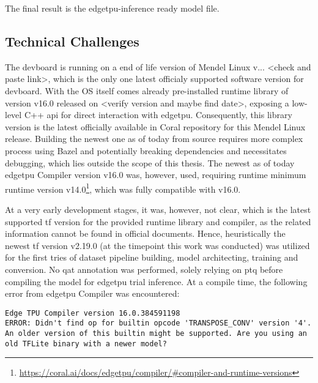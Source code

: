 {The final result is the \gls{edgetpu}-inference ready  model file.

\subsection*{Technical Challenges}

The \gls{devboard} is running on a end of life version of Mendel Linux v...  <check and paste link>, which is the only one latest officialy supported software version for \gls{devboard}.
With the OS itself comes already pre-installed runtime library  of version v16.0 released on <verify version and maybe find date>, exposing a low-level C++ \gls{api}
for direct interaction with \gls{edgetpu}. Consequently, this library version is the latest officially available in Coral repository for this Mendel Linux release.
Building the newest one as of today from source requires more complex process using Bazel and potentially breaking dependencies and necessitates debugging,
which lies outside the scope of this thesis.
The newest as of today \gls{edgetpu} Compiler version v16.0 was, however, used,
requiring runtime minimum runtime version v14.0\footnote{\url{https://coral.ai/docs/edgetpu/compiler/\#compiler-and-runtime-versions}},
which was fully compatible with  v16.0.


At a very early development stages, it was, however, not clear, which is the latest supported \gls{tf} version for the provided runtime library and compiler,
as the related information cannot be found in official documents.
Hence, heuristically the newest \gls{tf} version v2.19.0 (at the timepoint this work was conducted) was utilized for the first tries of dataset pipeline building,
model architecting, training and conversion. No \gls{qat} annotation was performed, solely relying on \gls{ptq} before compiling the model for \gls{edgetpu} trial inference.
At a compile time, the following error from \gls{edgetpu} Compiler was encountered:

\begin{lstlisting}
Edge TPU Compiler version 16.0.384591198
ERROR: Didn't find op for builtin opcode 'TRANSPOSE_CONV' version '4'. An older version of this builtin might be supported. Are you using an old TFLite binary with a newer model?
\end{lstlisting}

}
